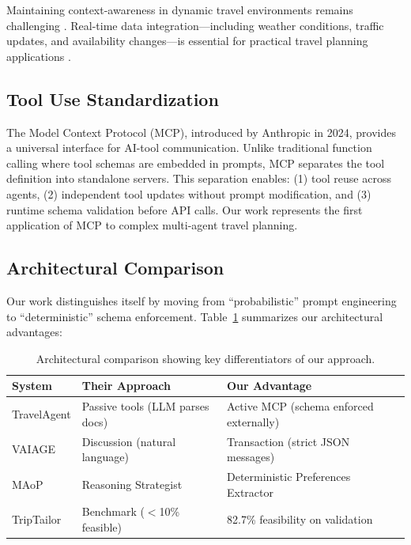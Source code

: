 \documentclass[preprint,review,12pt]{elsarticle}
\begin{document}
Maintaining context-awareness in dynamic travel environments remains challenging \citep{anitha2025intelligent}. Real-time data integration---including weather conditions, traffic updates, and availability changes---is essential for practical travel planning applications \citep{ravindra2025seamless}.

\subsection{Tool Use Standardization}

The Model Context Protocol (MCP), introduced by Anthropic in 2024, provides a universal interface for AI-tool communication. Unlike traditional function calling where tool schemas are embedded in prompts, MCP separates the tool definition into standalone servers. This separation enables: (1) tool reuse across agents, (2) independent tool updates without prompt modification, and (3) runtime schema validation before API calls. Our work represents the first application of MCP to complex multi-agent travel planning.

\subsection{Architectural Comparison}

Our work distinguishes itself by moving from ``probabilistic'' prompt engineering to ``deterministic'' schema enforcement. Table~\ref{tab:arch_comparison} summarizes our architectural advantages:

\begin{table}[h]
\centering
\caption{Architectural comparison showing key differentiators of our approach.}
\label{tab:arch_comparison}
\begin{tabular}{p{2.5cm}p{4cm}p{5cm}}
\toprule
\textbf{System} & \textbf{Their Approach} & \textbf{Our Advantage} \\
\midrule
TravelAgent & Passive tools (LLM parses docs) & Active MCP (schema enforced externally) \\
VAIAGE & Discussion (natural language) & Transaction (strict JSON messages) \\
MAoP & Reasoning Strategist & Deterministic Preferences Extractor \\
TripTailor & Benchmark ($<$10\% feasible) & 82.7\% feasibility on validation \\
\bottomrule
\end{tabular}
\end{table}
\end{document}

